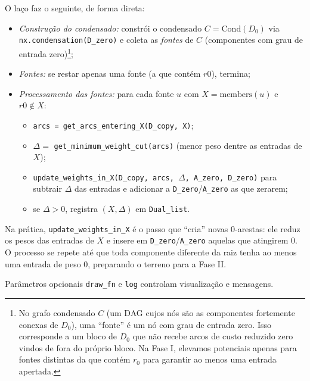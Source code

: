 O laço faz o seguinte, de forma direta:
\begin{itemize}
	\item \emph{Construção do condensado:} constrói o condensado \(C=\mathrm{Cond}(D_0)\) via \texttt{nx.condensation(D\_zero)} e coleta as \emph{fontes} de \(C\) (componentes com grau de entrada zero)\footnote{No grafo condensado \(C\) (um DAG cujos nós são as componentes fortemente conexas de \(D_0\)), uma ``fonte'' é um nó com grau de entrada zero. Isso corresponde a um bloco de \(D_0\) que não recebe arcos de custo reduzido zero vindos de fora do próprio bloco. Na Fase I, elevamos potenciais apenas para fontes distintas da que contém \(r_0\) para garantir ao menos uma entrada apertada.};
	\item \emph{Fontes:} se restar apenas uma fonte (a que contém \(r0\)), termina;
	\item \emph{Processamento das fontes:} para cada fonte \(u\) com \(X=\text{members}(u)\) e \(r0\notin X\):
	      \begin{itemize}
		      \item \texttt{arcs = get\_arcs\_entering\_X(D\_copy, X)};
		      \item \(\Delta =\) \texttt{get\_minimum\_weight\_cut(arcs)} (menor peso dentre as entradas de \(X\));
		      \item \texttt{update\_weights\_in\_X(D\_copy, arcs, \(\Delta\), A\_zero, D\_zero)} para subtrair \(\Delta\) das entradas e adicionar a \texttt{D\_zero}/\texttt{A\_zero} as que zerarem;
		      \item se \(\Delta>0\), registra \((X,\Delta)\) em \texttt{Dual\_list}.
	      \end{itemize}
\end{itemize}

Na prática, \texttt{update\_weights\_in\_X} é o passo que “cria” novas 0-arestas: ele reduz os pesos das entradas de \(X\) e insere em \texttt{D\_zero}/\texttt{A\_zero} aquelas que atingirem 0. O processo se repete até que toda componente diferente da raiz tenha ao menos uma entrada de peso 0, preparando o terreno para a Fase II.


Parâmetros opcionais \texttt{draw\_fn} e \texttt{log} controlam visualização e mensagens.

